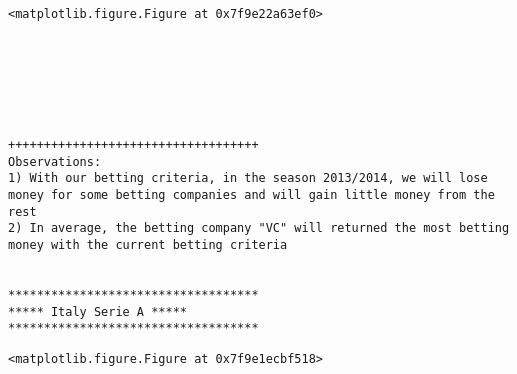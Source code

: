 \documentclass[11pt]{article}
\begin{document}
    
    \begin{center}
    \end{center}
    { \hspace*{\fill} \\}
    
    
    \begin{verbatim}
<matplotlib.figure.Figure at 0x7f9e22a63ef0>
    \end{verbatim}

    
    \begin{center}
    \end{center}
    { \hspace*{\fill} \\}
    
    \begin{center}
    \end{center}
    { \hspace*{\fill} \\}
    
    \begin{center}
    \end{center}
    { \hspace*{\fill} \\}
    
    \begin{Verbatim}[commandchars=\\\{\}]
+++++++++++++++++++++++++++++++++++
Observations: 
1) With our betting criteria, in the season 2013/2014, we will lose money for some betting companies and will gain little money from the rest
2) In average, the betting company "VC" will returned the most betting money with the current betting criteria


***********************************
***** Italy Serie A *****
***********************************

    \end{Verbatim}

    
    \begin{verbatim}
<matplotlib.figure.Figure at 0x7f9e1ecbf518>
    \end{verbatim}

    
    \begin{center}
    \end{center}
    { \hspace*{\fill} \\}
    
\end{document}
